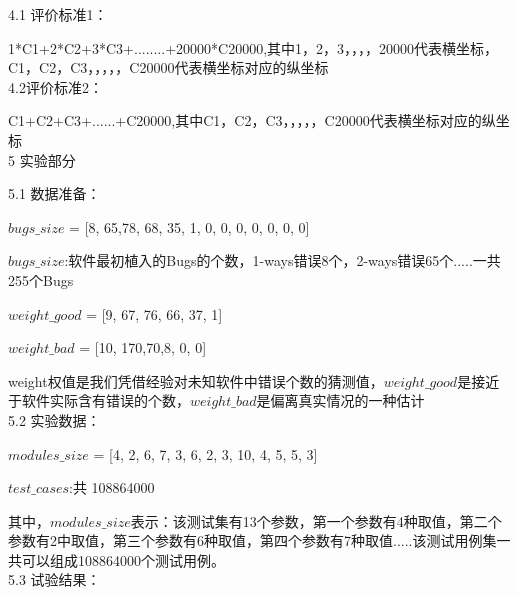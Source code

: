 \documentclass[10pt,journal,letterpaper,compsoc]{IEEEtran}
\begin{document}
\begin{CJK}{UTF8}{gkai}
4.1 评价标准1：

	1*C1+2*C2+3*C3+........+20000*C20000,其中1，2，3，，，，20000代表横坐标，C1，C2，C3，，，，，C20000代表横坐标对应的纵坐标
\\4.2评价标准2：

	C1+C2+C3+......+C20000,其中C1，C2，C3，，，，，C20000代表横坐标对应的纵坐标
\\5 实验部分

5.1 数据准备：

	$bugs\_size$ = [8, 65,78, 68, 35, 1, 0, 0, 0, 0, 0, 0, 0]   

	$bugs\_size$:软件最初植入的Bugs的个数，1-ways错误8个，2-ways错误65个.....一共255个Bugs

	$weight\_good$ = [9, 67, 76, 66, 37, 1] 

	$weight\_bad$ = [10, 170,70,8, 0, 0]

	weight权值是我们凭借经验对未知软件中错误个数的猜测值，$weight\_good$是接近于软件实际含有错误的个数，$weight\_bad$是偏离真实情况的一种估计
\\5.2 实验数据：   
 
	$modules\_size$ = [4, 2, 6, 7, 3, 6, 2, 3, 10, 4, 5, 5, 3] 

	$test\_cases$:共 108864000

	其中，$modules\_size$表示：该测试集有13个参数，第一个参数有4种取值，第二个参数有2中取值，第三个参数有6种取值，第四个参数有7种取值.....该测试用例集一共可以组成108864000个测试用例。
\\5.3 试验结果：


\end{CJK}
\end{document}

